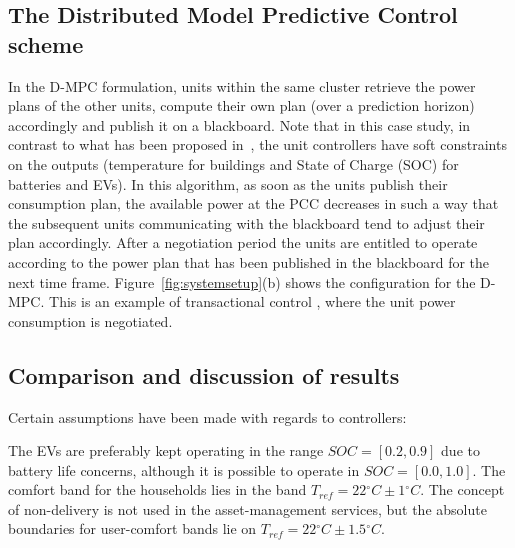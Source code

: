 \subsection{The Distributed Model Predictive Control scheme}
In the D-MPC formulation, units within the same cluster retrieve the power plans of the other units, compute their own plan (over a prediction horizon) accordingly and publish it on a blackboard. Note that in this case study, in contrast to what has been proposed in~\cite{costanzo2013coordination}, the unit controllers have soft constraints on the outputs (temperature for buildings and State of Charge (SOC) for batteries and EVs). In this algorithm, as soon as the units publish their consumption plan, the available power at the PCC decreases in such a way that the subsequent units communicating with the blackboard tend to adjust their plan accordingly. After a negotiation period the units are entitled to operate according to the power plan that has been published in the blackboard for the next time frame. Figure~\ref{fig:systemsetup}(b) shows the configuration for the D-MPC. This is an example of transactional control \cite{kosek2013overview}, where the unit power consumption is negotiated.
\subsection{Comparison and discussion of results} \label{sub:comparison}
Certain assumptions have been made with regards to controllers:

The EVs are preferably kept operating in the range $SOC = [0.2,0.9]$ due to battery life concerns\cite{6345063}, although it is possible to operate in $SOC=[0.0,1.0]$.
The comfort band for the households lies in the band $T_{ref}=22{}^{\circ} C \pm 1{}^{\circ} C $. The concept of non-delivery is not used in the asset-management services, but the absolute boundaries for user-comfort bands lie on $T_{ref}=22{}^{\circ} C \pm 1.5{}^{\circ} C $.

